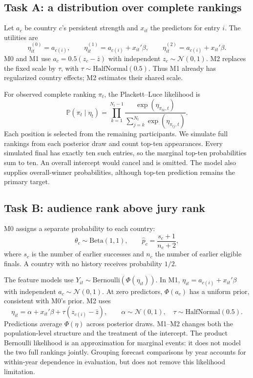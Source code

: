 \documentclass[11pt,a4paper]{article}
\newcommand{\Prob}{\mathbb P}
\newcommand{\Normal}{\mathcal N}
\begin{document}
\subsection{Task A: a distribution over complete rankings}
Let $a_c$ be country $c$'s persistent strength and $x_{it}$ the predictors for entry $i$. The utilities are
\begin{equation}
 \eta_{it}^{(0)}=a_{c(i)},\qquad
 \eta_{it}^{(1)}=a_{c(i)}+x_{it}'\beta,\qquad
 \eta_{it}^{(2)}=a_{c(i)}+x_{it}'\beta.
\end{equation}
M0 and M1 use $a_c=0.5(z_c-\bar z)$ with independent $z_c\sim\Normal(0,1)$. M2 replaces the fixed scale by $\tau$, with $\tau\sim\mathrm{HalfNormal}(0.5)$. Thus M1 already has regularized country effects; M2 estimates their shared scale.

For observed complete ranking $\pi_t$, the Plackett--Luce likelihood is
\begin{equation}
 \Prob(\pi_t\mid\eta_t)=\prod_{k=1}^{N_t-1}
 \frac{\exp(\eta_{\pi_{tk},t})}{\sum_{j=k}^{N_t}\exp(\eta_{\pi_{tj},t})}.
\end{equation}
Each position is selected from the remaining participants. We simulate full rankings from each posterior draw and count top-ten appearances. Every simulated final has exactly ten such entries, so the marginal top-ten probabilities sum to ten. An overall intercept would cancel and is omitted. The model also supplies overall-winner probabilities, although top-ten prediction remains the primary target.

\subsection{Task B: audience rank above jury rank}
M0 assigns a separate probability to each country:
\begin{equation}
 \theta_c\sim\mathrm{Beta}(1,1),\qquad
 \widehat p_c=\frac{s_c+1}{n_c+2},
\end{equation}
where $s_c$ is the number of earlier successes and $n_c$ the number of earlier eligible finals. A country with no history receives probability $1/2$.

The feature models use $Y_{it}\sim\mathrm{Bernoulli}(\Phi(\eta_{it}))$. In M1,
$\eta_{it}=a_{c(i)}+x_{it}'\beta$ with independent $a_c\sim\Normal(0,1)$.
At zero predictors, $\Phi(a_c)$ has a uniform prior, consistent with M0's prior. M2 uses
\begin{equation}
 \eta_{it}=\alpha+x_{it}'\beta+\tau(z_{c(i)}-\bar z),\qquad
 \alpha\sim\Normal(0,1),\quad \tau\sim\mathrm{HalfNormal}(0.5).
\end{equation}
Predictions average $\Phi(\eta)$ across posterior draws. M1--M2 changes both the population-level structure and the treatment of the intercept. The product Bernoulli likelihood is an approximation for marginal events: it does not model the two full rankings jointly. Grouping forecast comparisons by year accounts for within-year dependence in evaluation, but does not remove this likelihood limitation.
\end{document}
